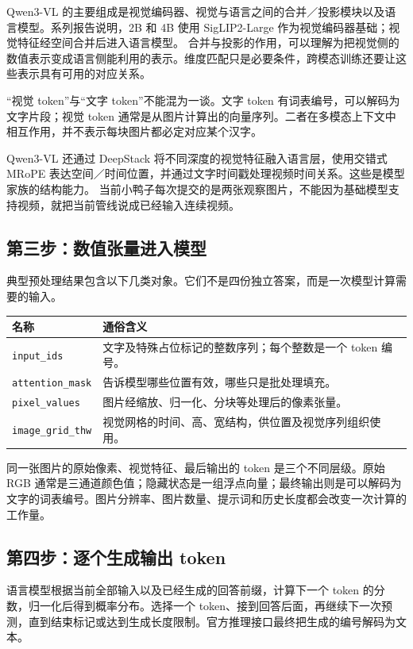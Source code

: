 Qwen3-VL 的主要组成是视觉编码器、视觉与语言之间的合并／投影模块以及语言模型。系列报告说明，2B 和 4B 使用 SigLIP2-Large 作为视觉编码器基础；视觉特征经空间合并后进入语言模型。\cite{qwen-report} 合并与投影的作用，可以理解为把视觉侧的数值表示变成语言侧能利用的表示。维度匹配只是必要条件，跨模态训练还要让这些表示具有可用的对应关系。

“视觉 token”与“文字 token”不能混为一谈。文字 token 有词表编号，可以解码为文字片段；视觉 token 通常是从图片计算出的向量序列。二者在多模态上下文中相互作用，并不表示每块图片都必定对应某个汉字。

Qwen3-VL 还通过 DeepStack 将不同深度的视觉特征融入语言层，使用交错式 MRoPE 表达空间／时间位置，并通过文字时间戳处理视频时间关系。这些是模型家族的结构能力。\cite{qwen-repo} 当前小鸭子每次提交的是两张观察图片，不能因为基础模型支持视频，就把当前管线说成已经输入连续视频。

\subsection{第三步：数值张量进入模型}

典型预处理结果包含以下几类对象。它们不是四份独立答案，而是一次模型计算需要的输入。\cite{multimodal-template}

\begin{longtable}{P{4.0cm}P{10.5cm}}
\textbf{名称} & \textbf{通俗含义} \\
\hline
\texttt{input\_ids} & 文字及特殊占位标记的整数序列；每个整数是一个 token 编号。\\
\texttt{attention\_mask} & 告诉模型哪些位置有效，哪些只是批处理填充。\\
\texttt{pixel\_values} & 图片经缩放、归一化、分块等处理后的像素张量。\\
\texttt{image\_grid\_thw} & 视觉网格的时间、高、宽结构，供位置及视觉序列组织使用。\\
\end{longtable}

同一张图片的原始像素、视觉特征、最后输出的 token 是三个不同层级。原始 RGB 通常是三通道颜色值；隐藏状态是一组浮点向量；最终输出则是可以解码为文字的词表编号。图片分辨率、图片数量、提示词和历史长度都会改变一次计算的工作量。

\subsection{第四步：逐个生成输出 token}

语言模型根据当前全部输入以及已经生成的回答前缀，计算下一个 token 的分数，归一化后得到概率分布。选择一个 token、接到回答后面，再继续下一次预测，直到结束标记或达到生成长度限制。官方推理接口最终把生成的编号解码为文本。\cite{qwen-transformers}

